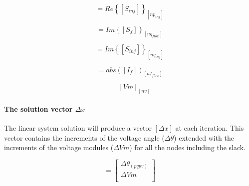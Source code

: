 \documentclass[nols,a4paper,twoside,symmetric,notoc,fleqn]{tufte-book}
\begin{document}
\begin{equation}
[b3] = Re\left\{ [S_{inj}]  \right\}_{[np_{inj}]}
\end{equation}




\begin{equation}
[c3] = Im\left\{  [S_f] \right\}_{[nq_{flow}]}
\end{equation}



\begin{equation}
[d3] = Im\left\{ [S_{inj}] \right\}_{[nq_{inj}]}
\end{equation}



\begin{equation}
[e3] = abs\left([I_f]\right)_{[nI_{flow}]}
\end{equation}


\begin{equation}
[f3] = [Vm]_{[nv]}
\end{equation}



\paragraph{The solution vector $\Delta x$}

The linear system solution will produce a vector $[\Delta x]$ at each iteration. This vector contains the increments of the voltage angle ($\Delta \theta$) extended with the increments of the voltage modules ($\Delta Vm$) for all the nodes including the slack.


\begin{equation}
[\Delta x] =
\left[
\begin{array}{cc}
 \Delta \theta_{(pqpv)} \\
 \Delta Vm\\
\end{array}
\right]
\label{SE_voltage_inc}
\end{equation}
\end{document}
